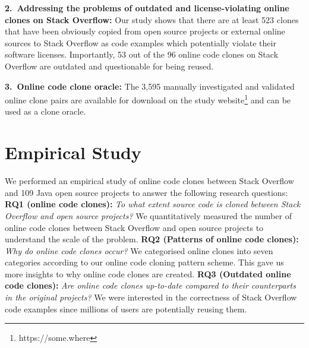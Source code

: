 \documentclass[sigconf,review, anonymous]{acmart}
\begin{document}
\vspace{0.5ex}%
\noindent\textbf{2.~Addressing the problems of outdated and license-violating online clones on Stack Overflow:} Our study shows that there are at least 523 clones that have been obviously copied from open source projects or external online sources to Stack Overflow as code examples which potentially violate their software licenses. Importantly, 53 out of the 96 online code clones on Stack Overflow are outdated and questionable for being reused.

\vspace{0.5ex}%
\noindent\textbf{3.~Online code clone oracle:} The 3,595 manually investigated and validated online clone pairs are available for download on the study website\footnote{https://some.where} and can be used as a clone oracle.

\section{Empirical Study}
We performed an empirical study of online code clones between Stack Overflow and 109 Java open source projects to answer the following research questions: \\ 
\textbf{RQ1 (online code clones):} \textit{To what extent  source code is cloned between Stack Overflow and open source projects?} We quantitatively measured the number of online code clones between Stack Overflow and open source projects to understand the scale of the problem. \newline
\textbf{RQ2 (Patterns of online code clones):} \textit{Why do online code clones occur?} We categorised online clones into seven categories according to our online code cloning pattern scheme. This gave us more insights to why online code clones are created. %
\newline
\textbf{RQ3 (Outdated online code clones):} \textit{Are online code clones up-to-date compared to their counterparts in the original projects?} We were interested in the correctness of Stack Overflow code examples since millions of users are potentially reusing them.  %
\end{document}
